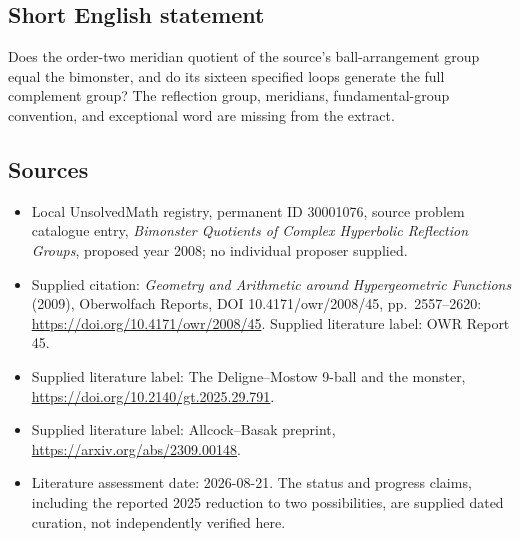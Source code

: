 \documentclass[11pt]{article}
\begin{document}
\subsection{Short English statement}
Does the order-two meridian quotient of the source's ball-arrangement group equal the bimonster, and do its sixteen specified loops generate the full complement group? The reflection group, meridians, fundamental-group convention, and exceptional word are missing from the extract.
\subsection{Sources}
\begin{itemize}\item Local UnsolvedMath registry, permanent ID 30001076, source problem catalogue entry, \emph{Bimonster Quotients of Complex Hyperbolic Reflection Groups}, proposed year 2008; no individual proposer supplied.\item Supplied citation: \emph{Geometry and Arithmetic around Hypergeometric Functions} (2009), Oberwolfach Reports, DOI 10.4171/owr/2008/45, pp.\ 2557--2620: \url{https://doi.org/10.4171/owr/2008/45}. Supplied literature label: OWR Report 45.\item Supplied literature label: The Deligne--Mostow 9-ball and the monster, \url{https://doi.org/10.2140/gt.2025.29.791}.\item Supplied literature label: Allcock--Basak preprint, \url{https://arxiv.org/abs/2309.00148}.\item Literature assessment date: 2026-08-21. The status and progress claims, including the reported 2025 reduction to two possibilities, are supplied dated curation, not independently verified here.\end{itemize}
\end{document}
